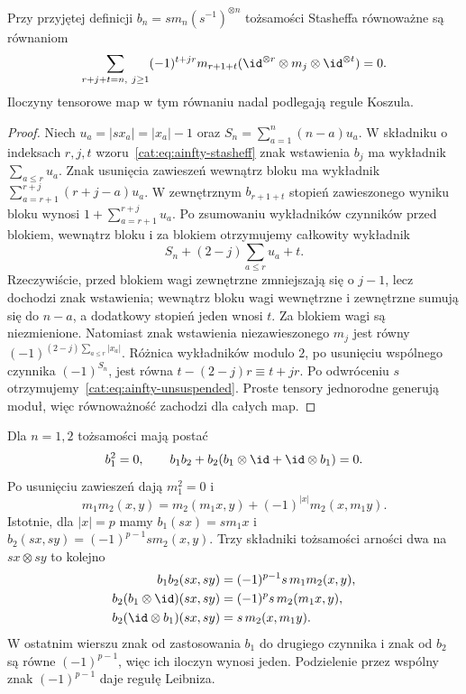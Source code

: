 \begin{wniosek}\label{cat:cor:ainfty-unsuspended}
Przy przyjętej definicji $b_n=s m_n(s^{-1})^{\otimes n}$ tożsamości Stasheffa równoważne są równaniom
\begin{equation}\label{cat:eq:ainfty-unsuspended}
 \sum_{r+j+t=n,\ j\geq1}(-1)^{t+jr}
 m_{r+1+t}(\id^{\otimes r}\otimes m_j\otimes\id^{\otimes t})=0.
\end{equation}
Iloczyny tensorowe map w tym równaniu nadal podlegają regule Koszula.
\end{wniosek}
\begin{proof}
Niech $u_a=|sx_a|=|x_a|-1$ oraz $S_n=\sum_{a=1}^n(n-a)u_a$. W składniku o indeksach $r,j,t$ wzoru~\eqref{cat:eq:ainfty-stasheff} znak wstawienia $b_j$ ma wykładnik $\sum_{a\leq r}u_a$. Znak usunięcia zawieszeń wewnątrz bloku ma wykładnik $\sum_{a=r+1}^{r+j}(r+j-a)u_a$. W zewnętrznym $b_{r+1+t}$ stopień zawieszonego wyniku bloku wynosi $1+\sum_{a=r+1}^{r+j}u_a$. Po zsumowaniu wykładników czynników przed blokiem, wewnątrz bloku i za blokiem otrzymujemy całkowity wykładnik
\[
 S_n+(2-j)\sum_{a\leq r}u_a+t.
\]
Rzeczywiście, przed blokiem wagi zewnętrzne zmniejszają się o $j-1$, lecz dochodzi znak wstawienia; wewnątrz bloku wagi wewnętrzne i zewnętrzne sumują się do $n-a$, a dodatkowy stopień jeden wnosi $t$. Za blokiem wagi są niezmienione. Natomiast znak wstawienia niezawieszonego $m_j$ jest równy $(-1)^{(2-j)\sum_{a\leq r}|x_a|}$. Różnica wykładników modulo $2$, po usunięciu wspólnego czynnika $(-1)^{S_n}$, jest równa $t-(2-j)r\equiv t+jr$. Po odwróceniu $s$ otrzymujemy~\eqref{cat:eq:ainfty-unsuspended}. Proste tensory jednorodne generują moduł, więc równoważność zachodzi dla całych map.
\end{proof}

Dla $n=1,2$ tożsamości mają postać
\[
 b_1^2=0,\qquad b_1b_2+b_2(b_1\otimes\id+\id\otimes b_1)=0.
\]
Po usunięciu zawieszeń dają $m_1^2=0$ i
\[
 m_1m_2(x,y)=m_2(m_1x,y)+(-1)^{|x|}m_2(x,m_1y).
\]
Istotnie, dla $|x|=p$ mamy $b_1(sx)=s m_1x$ i $b_2(sx,sy)=(-1)^{p-1}s m_2(x,y)$. Trzy składniki tożsamości arności dwa na $sx\otimes sy$ to kolejno
\[
\begin{aligned}
 b_1b_2(sx,sy)&=(-1)^{p-1}s\,m_1m_2(x,y),\\
 b_2(b_1\otimes\id)(sx,sy)&=(-1)^p s\,m_2(m_1x,y),\\
 b_2(\id\otimes b_1)(sx,sy)&=s\,m_2(x,m_1y).
\end{aligned}
\]
W ostatnim wierszu znak od zastosowania $b_1$ do drugiego czynnika i znak od $b_2$ są równe $(-1)^{p-1}$, więc ich iloczyn wynosi jeden. Podzielenie przez wspólny znak $(-1)^{p-1}$ daje regułę Leibniza.

